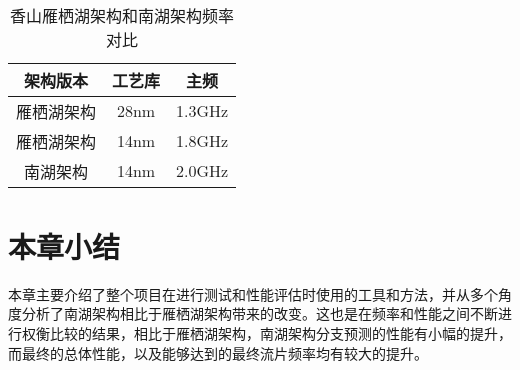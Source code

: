 ~\\

\begin{table}[!h]
	\caption{香山雁栖湖架构和南湖架构频率对比}
	\label{tb:table3}
	\centering
	\begin{tabular}{|c|c|c|}
		\hline
		架构版本   & 工艺库   & 主频   \\ \hline
		雁栖湖架构 & 28nm & 1.3GHz \\ \hline
		雁栖湖架构 & 14nm & 1.8GHz \\ \hline
		南湖架构 & 14nm & 2.0GHz \\ \hline
	\end{tabular}
\end{table}


\section{本章小结}

本章主要介绍了整个项目在进行测试和性能评估时使用的工具和方法，并从多个角度分析了南湖架构相比于雁栖湖架构带来的改变。这也是在频率和性能之间不断进行权衡比较的结果，相比于雁栖湖架构，南湖架构分支预测的性能有小幅的提升，而最终的总体性能，以及能够达到的最终流片频率均有较大的提升。